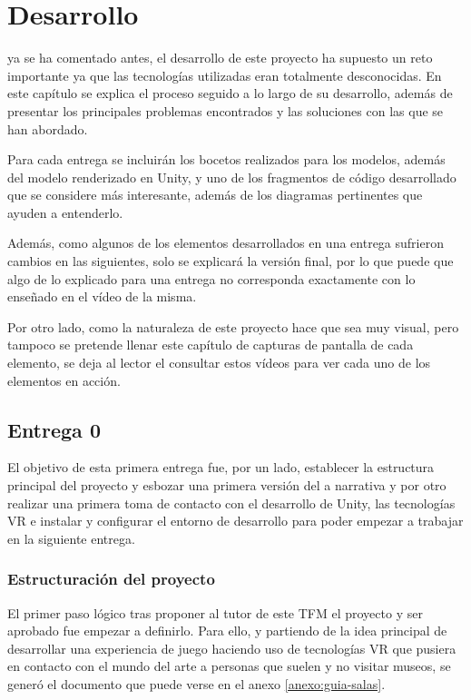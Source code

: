 \chapter{Desarrollo}
\label{chap:desarrollo}

 ya se ha comentado antes, el desarrollo de este proyecto ha supuesto un reto importante ya que las tecnologías utilizadas eran totalmente desconocidas. En este capítulo se explica el proceso seguido a lo largo de su desarrollo, además de presentar los principales problemas encontrados y las soluciones con las que se han abordado.

Para cada entrega se incluirán los bocetos realizados para los modelos, además del modelo renderizado en Unity, y uno de los fragmentos de código desarrollado que se considere más interesante, además de los diagramas pertinentes que ayuden a entenderlo.

Además, como algunos de los elementos desarrollados en una entrega sufrieron cambios en las siguientes, solo se explicará la versión final, por lo que puede que algo de lo explicado para una entrega no corresponda exactamente con lo enseñado en el vídeo de la misma.

Por otro lado, como la naturaleza de este proyecto hace que sea muy visual, pero tampoco se pretende llenar este capítulo de capturas de pantalla de cada elemento, se deja al lector el consultar estos vídeos para ver cada uno de los elementos en acción.

\section{Entrega 0}

El objetivo de esta primera entrega fue, por un lado, establecer la estructura principal del proyecto y esbozar una primera versión del a narrativa y por otro realizar una primera toma de contacto con el desarrollo de Unity, las tecnologías \acs{VR} e instalar y configurar el entorno de desarrollo para poder empezar a trabajar en la siguiente entrega.

\subsection{Estructuración del proyecto}

El primer paso lógico tras proponer al tutor de este \acs{TFM} el proyecto y ser aprobado fue empezar a definirlo. Para ello, y partiendo de la idea principal de desarrollar una experiencia de juego haciendo uso de tecnologías \acs{VR} que pusiera en contacto con el mundo del arte a personas que suelen y no visitar museos, se generó el documento que puede verse en el anexo \ref{anexo:guia-salas}. 

